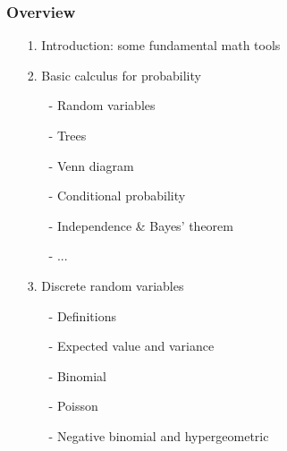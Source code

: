 \documentclass[notes=show,handout]{beamer}
\begin{document}
%
%
%
%
%
%
%
%
%
%
%
%

\begin{frame}
\frametitle{Overview}

\begin{enumerate}
\item[1.]  Introduction: some fundamental math tools
\item[2.] Basic calculus for probability
\begin{itemize}
\item[-] Random variables
\item[-] Trees
\item[-] Venn diagram
\item[-] Conditional probability
\item[-] Independence \& Bayes' theorem
\item[-] ...
\end{itemize}

\item[3.] Discrete random variables
\begin{itemize}
\item[-] Definitions
\item[-] Expected value and variance
\item[-] Binomial
\item[-] Poisson
\item[-] Negative binomial and hypergeometric
\end{itemize}

\end{enumerate}
\end{frame}
\end{document}

